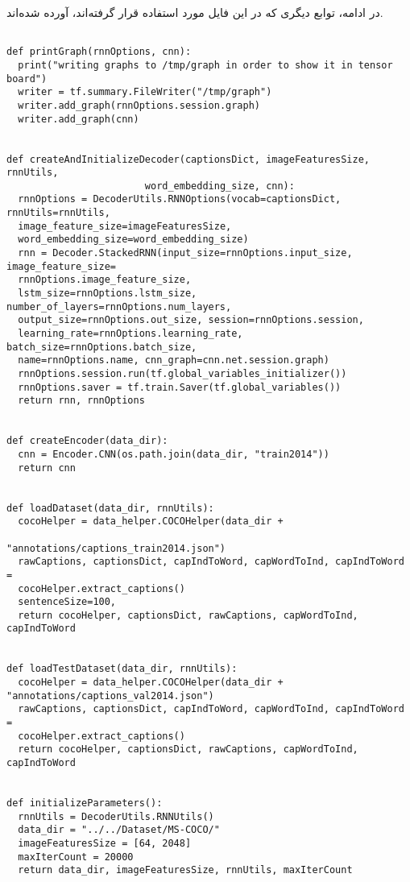 در ادامه، توابع دیگری که در این فایل مورد استفاده قرار گرفته‌اند، آورده شده‌اند.

\begin{latin}
	\begin{verbatim}

def printGraph(rnnOptions, cnn):
  print("writing graphs to /tmp/graph in order to show it in tensor board")
  writer = tf.summary.FileWriter("/tmp/graph")
  writer.add_graph(rnnOptions.session.graph)
  writer.add_graph(cnn)


def createAndInitializeDecoder(captionsDict, imageFeaturesSize, rnnUtils, 
                        word_embedding_size, cnn):
  rnnOptions = DecoderUtils.RNNOptions(vocab=captionsDict, rnnUtils=rnnUtils, 
  image_feature_size=imageFeaturesSize,
  word_embedding_size=word_embedding_size)
  rnn = Decoder.StackedRNN(input_size=rnnOptions.input_size, image_feature_size=
  rnnOptions.image_feature_size,
  lstm_size=rnnOptions.lstm_size, number_of_layers=rnnOptions.num_layers,
  output_size=rnnOptions.out_size, session=rnnOptions.session,
  learning_rate=rnnOptions.learning_rate, batch_size=rnnOptions.batch_size,
  name=rnnOptions.name, cnn_graph=cnn.net.session.graph)
  rnnOptions.session.run(tf.global_variables_initializer())
  rnnOptions.saver = tf.train.Saver(tf.global_variables())
  return rnn, rnnOptions


def createEncoder(data_dir):
  cnn = Encoder.CNN(os.path.join(data_dir, "train2014"))
  return cnn


def loadDataset(data_dir, rnnUtils):
  cocoHelper = data_helper.COCOHelper(data_dir + 
                                      "annotations/captions_train2014.json")
  rawCaptions, captionsDict, capIndToWord, capWordToInd, capIndToWord = 
  cocoHelper.extract_captions()
  sentenceSize=100,
  return cocoHelper, captionsDict, rawCaptions, capWordToInd, capIndToWord 


def loadTestDataset(data_dir, rnnUtils):
  cocoHelper = data_helper.COCOHelper(data_dir + "annotations/captions_val2014.json")
  rawCaptions, captionsDict, capIndToWord, capWordToInd, capIndToWord = 
  cocoHelper.extract_captions()
  return cocoHelper, captionsDict, rawCaptions, capWordToInd, capIndToWord  


def initializeParameters():
  rnnUtils = DecoderUtils.RNNUtils()
  data_dir = "../../Dataset/MS-COCO/"
  imageFeaturesSize = [64, 2048]
  maxIterCount = 20000
  return data_dir, imageFeaturesSize, rnnUtils, maxIterCount
\end{verbatim}
\end{latin}

